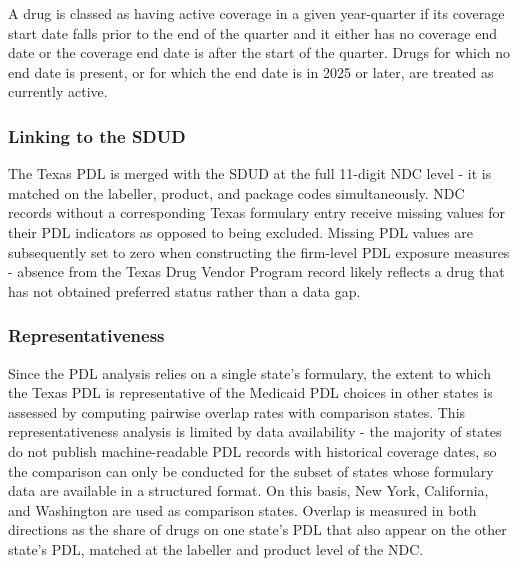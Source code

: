 \documentclass[12pt]{article}
\begin{document}
A drug is classed as having active coverage in a given year-quarter if its coverage start date falls prior to the end of the quarter and it either has no coverage end date or the coverage end date is after the start of the quarter. Drugs for which no end date is present, or for which the end date is in 2025 or later, are treated as currently active.

\subsubsection{Linking to the SDUD}

The Texas PDL is merged with the SDUD at the full 11-digit NDC level - it is matched on the labeller, product, and package codes simultaneously. NDC records without a corresponding Texas formulary entry receive missing values for their PDL indicators as opposed to being excluded. Missing PDL values are subsequently set to zero when constructing the firm-level PDL exposure measures - absence from the Texas Drug Vendor Program record likely reflects a drug that has not obtained preferred status rather than a data gap.

\subsubsection{Representativeness}

Since the PDL analysis relies on a single state's formulary, the extent to which the Texas PDL is representative of the Medicaid PDL choices in other states is assessed by computing pairwise overlap rates with comparison states. This representativeness analysis is limited by data availability - the majority of states do not publish machine-readable PDL records with historical coverage dates, so the comparison can only be conducted for the subset of states whose formulary data are available in a structured format. On this basis, New York, California, and Washington are used as comparison states. Overlap is measured in both directions as the share of drugs on one state's PDL that also appear on the other state's PDL, matched at the labeller and product level of the NDC.
\end{document}
